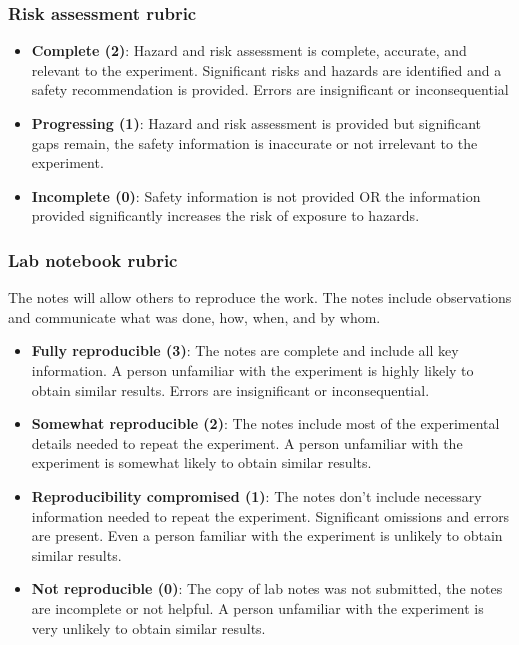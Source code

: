 \subsubsection{Risk assessment rubric}\label{risk-assessment-rubric}

\begin{itemize}
\tightlist
\item
  \textbf{Complete (2)}: Hazard and risk assessment is complete,
  accurate, and relevant to the experiment. Significant risks and
  hazards are identified and a safety recommendation is provided. Errors
  are insignificant or inconsequential
\item
  \textbf{Progressing (1)}: Hazard and risk assessment is provided but
  significant gaps remain, the safety information is inaccurate or not
  irrelevant to the experiment.
\item
  \textbf{Incomplete (0)}: Safety information is not provided OR the
  information provided significantly increases the risk of exposure to
  hazards.
\end{itemize}

\subsubsection{Lab notebook rubric}\label{lab-notebook-rubric}

The notes will allow others to reproduce the work. The notes include
observations and communicate what was done, how, when, and by whom.

\begin{itemize}
\tightlist
\item
  \textbf{Fully reproducible (3)}: The notes are complete and include
  all key information. A person unfamiliar with the experiment is highly
  likely to obtain similar results. Errors are insignificant or
  inconsequential.
\item
  \textbf{Somewhat reproducible (2)}: The notes include most of the
  experimental details needed to repeat the experiment. A person
  unfamiliar with the experiment is somewhat likely to obtain similar
  results.
\item
  \textbf{Reproducibility compromised (1)}: The notes don't include
  necessary information needed to repeat the experiment. Significant
  omissions and errors are present. Even a person familiar with the
  experiment is unlikely to obtain similar results.
\item
  \textbf{Not reproducible (0)}: The copy of lab notes was not
  submitted, the notes are incomplete or not helpful. A person
  unfamiliar with the experiment is very unlikely to obtain similar
  results.
\end{itemize}

